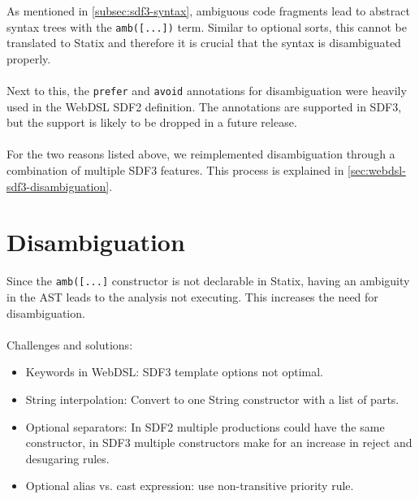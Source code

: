         As mentioned in \cref{subsec:sdf3-syntax}, ambiguous code fragments lead to abstract syntax trees with the \texttt{amb([...])} term. Similar to optional sorts, this cannot be translated to Statix and therefore it is crucial that the syntax is disambiguated properly.
        \\\\Next to this, the \texttt{prefer} and \texttt{avoid} annotations for disambiguation were heavily used in the WebDSL SDF2 definition. The annotations are supported in SDF3, but the support is likely to be dropped in a future release.
        \\\\For the two reasons listed above, we reimplemented disambiguation through a combination of multiple SDF3 features. This process is explained in \cref{sec:webdsl-sdf3-disambiguation}.

  \section{\label{sec:webdsl-sdf3-disambiguation}Disambiguation}
  
    Since the \texttt{amb([...]} constructor is not declarable in Statix, having an ambiguity in the AST leads to the analysis not executing. This increases the need for disambiguation.
    \\\\Challenges and solutions:
    \begin{itemize}
      \item Keywords in WebDSL: SDF3 template options not optimal.
      \item String interpolation: Convert to one String constructor with a list of parts.
      \item Optional separators: In SDF2 multiple productions could have the same constructor, in SDF3 multiple constructors make for an increase in reject and desugaring rules.
      \item Optional alias vs. cast expression: use non-transitive priority rule.
    \end{itemize}
